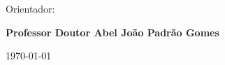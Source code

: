 \vspace{\vspacepre}
\begin{center}
\begin{normalsize}
\begin{large}
Orientador:
\end{large}
\end{normalsize}
\end{center}

\vspace{\vspaceinner}
\begin{center}
\begin{large}
\textbf{Professor Doutor Abel João Padrão Gomes}
\end{large}
\end{center}

%



\vspace{\vspacepre}
\begin{center}
\begin{normalsize}
\today
\end{normalsize}
\end{center}
